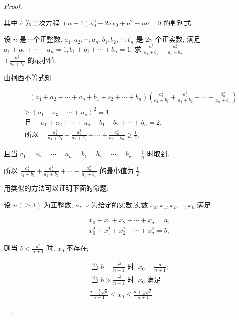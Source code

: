 \begin{proof}
\begin{example}
\begin{solution}
\begin{note}
	其中 $\delta$ 为二次方程 $(n+1) x_{0}^{2}-2 a x_{0}+a^{2}-n b=0$ 的判别式.
\end{note}

\begin{example}
	设 $n$ 是一个正整数, $a_{1}, a_{2}, \cdots, a_{n}, b_{1}, b_{2}, \cdots, b_{n}$ 是 $2 n$ 个正实数, 满足 $a_{1}+a_{2}+\cdots+a_{n}=1, b_{1}+b_{2}+\cdots+b_{n}=1$, 求 $\frac{a_{1}^{2}}{a_{1}+b_{1}}+\frac{a_{2}^{2}}{a_{2}+b_{2}}+\cdots$\\
	$+\frac{a_{n}^{2}}{a_{n}+b_{n}}$ 的最小值.
\end{example}
\begin{solution}
	由柯西不等式知
	
	$$
	\begin{aligned}
	& \quad\left(a_{1}+a_{2}+\cdots+a_{n}+b_{1}+b_{2}+\cdots+b_{n}\right)\left(\frac{a_{1}^{2}}{a_{1}+b_{1}}+\frac{a_{2}^{2}}{a_{2}+b_{2}}+\cdots+\frac{a_{n}^{2}}{a_{n}+b_{n}}\right) \\
	& \geqslant\left(a_{1}+a_{2}+\cdots+a_{n}\right)^{2}=1, \\
	& \text { 且 } \quad a_{1}+a_{2}+\cdots+a_{n}+b_{1}+b_{2}+\cdots+b_{n}=2, \\
	& \text { 所以 } \quad \frac{a_{1}^{2}}{a_{1}+b_{1}}+\frac{a_{2}^{2}}{a_{2}+b_{2}}+\cdots+\frac{a_{n}^{2}}{a_{n}+b_{n}} \geqslant \frac{1}{2},
	\end{aligned}
	$$
	
	且当 $a_{1}=a_{2}=\cdots=a_{n}=b_{1}=b_{2}=\cdots=b_{n}=\frac{1}{n}$ 时取到.
	
	所以 $\frac{a_{1}^{2}}{a_{1}+b_{1}}+\frac{a_{2}^{2}}{a_{2}+b_{2}}+\cdots+\frac{a_{n}^{2}}{a_{n}+b_{n}}$ 的最小值为 $\frac{1}{2}$.
\end{solution}
\begin{note}
	用类似的方法可以证明下面的命题:
	
	设 $n(\geqslant 3)$ 为正整数, $a 、 b$ 为给定的实数,实数 $x_{0}, x_{1}, x_{2}, \cdots, x_{n}$ 满足
	
	$$
	\begin{aligned}
	& x_{0}+x_{1}+x_{2}+\cdots+x_{n}=a, \\
	& x_{0}^{2}+x_{1}^{2}+x_{2}^{2}+\cdots+x_{n}^{2}=b,
	\end{aligned}
	$$
	
	则当 $b<\frac{a^{2}}{n+1}$ 时, $x_{0}$ 不存在;
	
	$$
	\begin{aligned}
	& \text { 当 } b=\frac{a^{2}}{n+1} \text { 时, } x_{0}=\frac{a}{n+1} \text {; } \\
	& \text { 当 } b>\frac{a^{2}}{n+1} \text { 时, } x_{0} \text { 满足 } \\
	& \frac{a-\frac{1}{2} \sqrt{\delta}}{n+1} \leqslant x_{0} \leqslant \frac{a+\frac{1}{2} \sqrt{\delta}}{n+1}
	\end{aligned}
	$$
	

\end{note}
\end{solution}
\end{example}
\end{proof}
